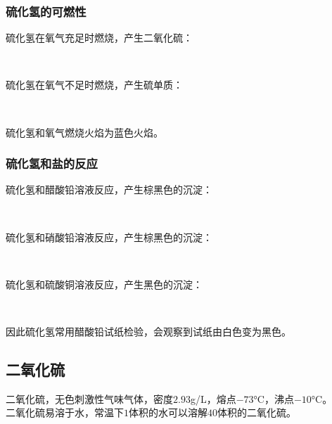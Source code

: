 \documentclass[UTF8]{ctexart}
\begin{document}
\subsubsection{硫化氢的可燃性}
    硫化氢在氧气充足时燃烧，产生二氧化硫：
    \begin{center}
        \\[6mm]
    \end{center}
    硫化氢在氧气不足时燃烧，产生硫单质：
    \begin{center}
        \\[6mm]
    \end{center}
    硫化氢和氧气燃烧火焰为蓝色火焰。\\

\subsubsection{硫化氢和盐的反应}
    硫化氢和醋酸铅溶液反应，产生棕黑色的沉淀：
    \begin{center}
        \\[6mm]
    \end{center}
    硫化氢和硝酸铅溶液反应，产生棕黑色的沉淀：
    \begin{center}
        \\[6mm]
    \end{center}
    硫化氢和硫酸铜溶液反应，产生黑色的沉淀：
    \begin{center}
        \\[6mm]
    \end{center}
    因此硫化氢常用醋酸铅试纸检验，会观察到试纸由白色变为黑色。

\newpage

\subsection{二氧化硫}
    二氧化硫，无色刺激性气味气体，密度$2.93$\si{g/L}，熔点$-73$\si{\degreeCelsius}，沸点$-10$\si{\degreeCelsius}。\\[3mm]
    二氧化硫易溶于水，常温下$1$体积的水可以溶解$40$体积的二氧化硫。
\end{document}
